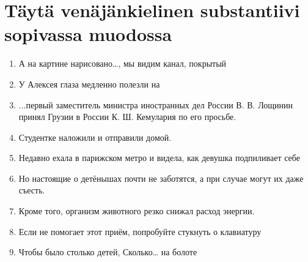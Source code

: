 \documentclass[paper=a4, fontsize=11pt]{scrartcl}
\begin{document}
\onehalfspacing

\section{Täytä venäjänkielinen substantiivi sopivassa muodossa}

\begin{enumerate}
    \item А на картине нарисовано…, мы видим канал, покрытый  
    \item У Алексея глаза медленно полезли на \raisebox{-0.5cm}{\shortstack{\underline{\hspace{3cm}}\\otsa}} 
    \item ...первый заместитель министра иностранных дел России В. В. Лощинин принял   Грузии в России К. Ш. Кемулария по его просьбе.
    \item Студентке наложили   и отправили домой.
    \item Недавно ехала в парижском метро и видела, как девушка подпиливает себе  
    \item Но настоящие  о детёнышах почти не заботятся, а при случае могут их даже съесть.
    \item Кроме того, \raisebox{-0.5cm}{\shortstack{\underline{\hspace{3cm}}\\unessa}} организм животного резко снижал расход энергии.
    \item Если не помогает этот приём, попробуйте стукнуть \raisebox{-0.5cm}{\shortstack{\underline{\hspace{3cm}}\\otsa}}  о клавиатуру
    \item Чтобы было столько детей, Сколько… на болоте   

\end{enumerate}
\end{document}

